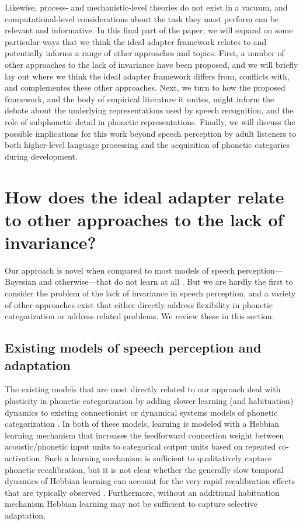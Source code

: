 Likewise, process- and mechanistic-level theories do not exist in a vacuum, and computational-level considerations about the task they must perform can be relevant and informative.
In this final part of the paper, we will expand on some particular ways that we think the ideal adapter framework relates to and potentially informs a range of other approaches and topics.
First, a number of other approaches to the lack of invariance have been proposed, and we will briefly lay out where we think the ideal adapter framework differs from, conflicts with, and complementes these other approaches.
Next, we turn to how the proposed framework, and the body of empirical literature it unites, might inform the debate about the underlying representations used by speech recognition, and the role of subphonetic detail in phonetic representations.
Finally, we will discuss the possible implications for this work beyond speech perception by adult listeners to both higher-level language processing and the acquisition of phonetic categories during development.

\section{How does the ideal adapter relate to other approaches to the lack of invariance?}
\label{sec:how-does-ideal-1}
\label{r2-part3-sec}

Our approach is novel when compared to most models of speech perception---Bayesian and otherwise---that do not learn at all \autocite{Clayards2008,Feldman2009a,McClelland1986,Norris1994,Norris2000}.  
But we are hardly the first to consider the problem of the lack of invariance in speech perception, and a variety of other approaches exist that either directly address flexibility in phonetic categorization or address related problems.  We review these in this section.

\subsection{Existing models of speech perception and adaptation}
\label{sec:exist-models-adapt}

The existing models that are most directly related to our approach deal with plasticity in phonetic categorization by adding slower learning (and habituation) dynamics to existing connectionist or dynamical systems models of phonetic categorization \autocite{Lancia2013,Mirman2006}.  In both of these models, learning is modeled with a Hebbian learning mechanism that increases the feedforward connection weight between acoustic/phonetic input units to categorical output units based on repeated co-activation.  Such a learning mechanism is sufficient to qualitatively capture phonetic recalibration, but it is not clear whether the generally slow temporal dynamics of Hebbian learning can account for the very rapid recalibration effects that are typically observed \autocite{Guediche2014}.  Furthermore, without an additional habituation mechanism \autocite[which \emph{is} present in][]{Lancia2013} Hebbian learning may not be sufficient to capture selective adaptation.  

